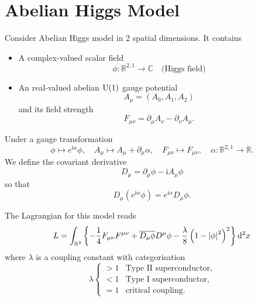 \documentclass[a4paper,11pt]{article}
\begin{document}
\begin{rmk}
    \end{rmk}
    \newpage
    \section{Abelian Higgs Model}
    
     Consider Abelian Higgs model in 2 spatial dimensions. It contains 
    \begin{itemize}
        \item A complex-valued scalar field \begin{equation}
            \phi : \mathbb{R}^{2,1} \to \mathbb{C} \quad \text{(Higgs field)}
        \end{equation}
        \item An real-valued abelian $\operatorname{U}(1)$ gauge potential \begin{equation}
            A_\mu = (A_0, A_1, A_2) 
        \end{equation}
        and its field strength 
        \begin{equation}
            F_{\mu \nu} = \partial_\mu A_\nu - \partial_\nu A_\mu.
        \end{equation}
    \end{itemize}
    Under a gauge transformation 
    \begin{equation}
        \phi \mapsto e^{\mathrm{i} \alpha} \phi, \quad A_\mu \mapsto A_\mu + \partial_\mu \alpha, \quad F_{\mu \nu} \mapsto F_{\mu \nu}, \quad \alpha : \mathbb{R}^{2,1} \to \mathbb{R}.
    \end{equation}
    We define the covariant derivative 
    \begin{equation}
        D_\mu = \partial_\mu \phi - \mathrm{i} A_\mu \phi
    \end{equation}
    so that 
    \begin{equation}
        D_\mu (e^{\mathrm{i} \alpha}\phi) = e^{\mathrm{i} \alpha} D_\mu \phi.
    \end{equation}

    The Lagrangian for this model reads 
    \begin{equation}
        L = \int_{\mathbb{R}^2} \left\{ - \frac{1}{4} F_{\mu \nu} F^{\mu \nu} + \overline{D_\mu \phi} D^\mu \phi - \frac{\lambda}{8} \left( 1 - \abs{\phi}^2 \right)^2 \right\} \dd[2]{x}
    \end{equation}
    where $\lambda$ is a coupling constant with categorisation 
    \begin{equation}
        \lambda \begin{cases}
            > 1 & \text{Type II superconductor},\\
            < 1 & \text{Type I superconductor},\\
            =1 & \text{critical coupling}.
        \end{cases}
    \end{equation}
\end{document}
